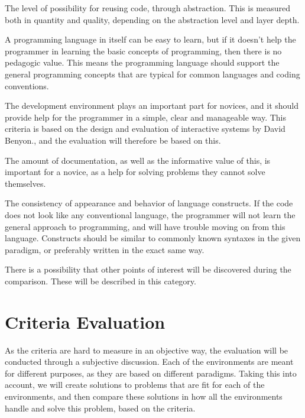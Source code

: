 \begin{description}[style=nextline]
\item[Reusability] The level of possibility for reusing code, through abstraction. This is measured both in quantity and quality, depending on the abstraction level and layer depth.
\item[Pedagogic Value] A programming language in itself can be easy to learn, but if it doesn't help the programmer in learning the basic concepts of programming, then there is no pedagogic value. This means the programming language should support the general programming concepts that are typical for common languages and coding conventions.
\item[Environment] The development environment plays an important part for novices, and it should provide help for the programmer in a simple, clear and manageable way. This criteria is based on the design and evaluation of interactive systems by David Benyon\cite[p. 225-250]{design_book}., and the evaluation will therefore be based on this.
\item[Documentation] The amount of documentation, as well as the informative value of this, is important for a novice, as a help for solving problems they cannot solve themselves.
\item[Uniformity] The consistency of appearance and behavior of language constructs. If the code does not look like any conventional language, the programmer will not learn the general approach to programming, and will have trouble moving on from this language. Constructs should be similar to commonly known syntaxes in the given paradigm, or preferably written in the exact same way.
\item[Miscellaneous] There is a possibility that other points of interest will be discovered during the comparison. These will be described in this category.
\end{description}

\section{Criteria Evaluation}
As the criteria are hard to measure in an objective way, the evaluation will be conducted through a subjective discussion. Each of the environments are meant for different purposes, as they are based on different paradigms. Taking this into account, we will create solutions to problems that are fit for each of the environments, and then compare these solutions in how all the environments handle and solve this problem, based on the criteria.